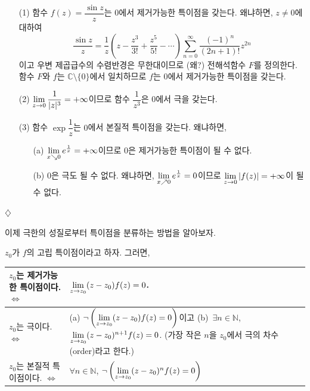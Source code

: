 \begin{saltexample}{}{}\label{example-4-14}

\begin{itemize}
\item[(1)] 함수 $f(z)=\dfrac{\sin z}z$는 $0$에서 제거가능한 특이점을 갖는다.
왜냐하면, $z\ne0$에 대하여
\[
\dfrac{\sin z}z = \dfrac 1z\left( z - \dfrac{z^3}{3!} + \dfrac{z^5}{5!} - \cdots
\right) \sum_{n=0}^\infty \dfrac{(-1)^n}{(2n+1)!}z^{2n}
\]
이고 우변 제곱급수의 수렴반경은 무한대이므로 (왜?)
전해석함수 $F$를 정의한다. 함수 $F$와 $f$는 $\mathbb C\setminus \{0\}$에서
일치하므로 $f$는 $0$에서 제거가능한 특이점을 갖는다.
\item[(2)] $\lim\limits_{z\to 0} \displaystyle\frac1{|z|^3} = + \infty$이므로
함수 $\dfrac1{z^3}$은 $0$에서 극을 갖는다.
\item[(3)] 함수 $\exp \dfrac1z$는 $0$에서 본질적 특이점을 갖는다. 왜냐하면,
\begin{itemize}
\item[(a)] $\lim\limits_{x\searrow 0} e^{\frac1x} = + \infty$이므로
$0$은 제거가능한 특이점이 될 수 없다.
\item[(b)] $0$은 극도 될 수 없다. 왜냐하면,
$\lim\limits_{x\nearrow 0} e^{\frac1x} =0$이므로  
$\lim\limits_{z\to 0} |f(z)| = + \infty$이 될 수 없다.
\end{itemize}
\end{itemize}
\hfill $\diamondsuit$
\end{saltexample}

이제 극한의 성질로부터 특이점을 분류하는 방법을 알아보자.

\begin{salttheorem} {}{} \label{thm-4-8}
$z_0$가 $f$의 고립 특이점이라고 하자. 그러면,
\begin{center}
{\footnotesize
\begin{tabular}{ |p{4cm}|p{6.5cm}| } 
 \hline
$z_0$는 제거가능한 특이점이다. \hfill $\Leftrightarrow$ 
& $\lim\limits_{z\to z_0} (z-z_0)f(z)=0$. \\ \hline 
$z_0$는 극이다. \hfill $\Leftrightarrow$ 
& (a) $\neg \left( \lim\limits_{z\to z_0} (z-z_0)f(z) = 0 \right)$이고 
(b)~$\exists n\in \mathbb N$, 
$\lim\limits_{z\to z_0} (z-z_0)^{n+1}f(z) = 0$.
(가장 작은 $n$을 $z_0$에서 극의 차수(order)라고 한다.) \\ \hline
$z_0$는 본질적 특이점이다. \hfill $\Leftrightarrow$ 
& $\forall n\in \mathbb N$,  
$\neg\left( \lim\limits_{z\to z_0} (z-z_0)^nf(z) = 0 \right)$ \\ 
 \hline
\end{tabular}
}
\end{center}
\end{salttheorem}

